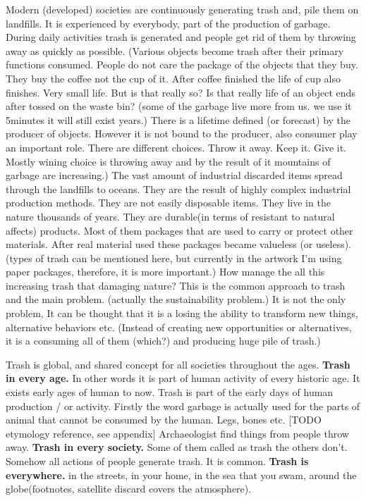 Modern (developed) societies are continuously generating trash and, pile them on landfills. It is experienced by everybody, part of the production of garbage. During daily activities trash is generated and people get rid of them by throwing away as quickly as possible. (Various objects become trash after their primary functions consumed. People do not care the package of the objects that they buy. They buy the coffee not the cup of it. After coffee finished the life of cup also finishes. Very small life. But is that really so? Is that really life of an object ends after tossed on the waste bin?  (some of the garbage live more from us. we use it 5minutes it will still exist years.) There is a lifetime defined (or forecast) by the producer of objects. However it is not bound to the producer, also consumer play an important role. There are different choices. Throw it away. Keep it. Give it. Mostly wining choice is throwing away and by the result of it mountains of garbage are increasing.) The vast amount of industrial discarded items spread through the landfills to oceans. They are the result of highly complex industrial production methods. They are not easily disposable items. They live in the nature thousands of years. They are durable(in terms of resistant to natural affects) products. Most of them packages that are used to carry or protect other materials. After real material used these packages became valueless (or useless). (types of trash can be mentioned here, but currently in the artwork I'm using paper packages, therefore, it is more important.) How manage the all this increasing trash that damaging nature?  This is the common approach to trash and the main problem. (actually the sustainability problem.) It is not the only problem, It can be thought that it is a losing the ability to transform new things, alternative behaviors etc. (Instead of creating new opportunities or alternatives, it is a consuming all of them (which?) and producing huge pile of trash.) 

Trash is global, and shared concept for all societies throughout the ages. 
\textbf{Trash in every age.} In other words it is part of human activity of every historic age. It exists early ages of human to now. Trash is part of the early days of human production / or activity. Firstly the word garbage is actually used for the parts of animal that cannot be consumed by the human. Legs, bones etc. [TODO etymology reference, see appendix] Archaeologist find things from people throw away. 
\textbf{Trash in every society.} Some of them called as trash the others don't. Somehow all actions of people generate trash. It is common. 
\textbf{Trash is everywhere.} in the streets, in your home, in the sea that you swam, around the globe(footnotes, satellite discard covers the atmosphere).

